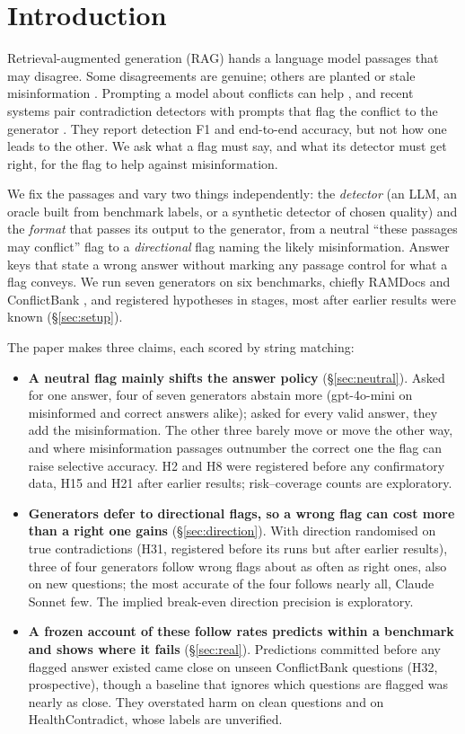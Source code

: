 \section{Introduction}

Retrieval-augmented generation (RAG) \citep{lewis2020rag} hands a language model passages that may disagree. Some
disagreements are genuine; others are planted or stale misinformation \citep{zou2025poisonedrag,wang2025madam}.
Prompting a model about conflicts can help \citep{cattan2025conflicts}, and recent systems pair contradiction
detectors with prompts that flag the conflict to the generator \citep{wang2026conflictrag}. They report detection F1
and end-to-end accuracy, but not how one leads to the other. We ask what a flag must say, and what its detector must
get right, for the flag to help against misinformation.

We fix the passages and vary two things independently: the \emph{detector} (an LLM, an oracle built from benchmark
labels, or a synthetic detector of chosen quality) and the \emph{format} that passes its output to the
generator, from a neutral ``these passages may conflict'' flag to a \emph{directional} flag naming the likely
misinformation. Answer keys that state a wrong answer without marking any passage control for what a flag conveys.
We run seven generators on six benchmarks, chiefly RAMDocs \citep{wang2025madam} and ConflictBank
\citep{su2024conflictbank}, and registered hypotheses in stages, most after earlier results were known
(\S\ref{sec:setup}).

The paper makes three claims, each scored by string matching:
\begin{itemize}[leftmargin=*,itemsep=1pt,topsep=2pt]
\item \textbf{A neutral flag mainly shifts the answer policy} (\S\ref{sec:neutral}). Asked for one answer, four
of seven generators abstain more (gpt-4o-mini on misinformed and correct answers alike); asked for every valid
answer, they add the misinformation. The other three barely move or move the other way, and where misinformation
passages outnumber the correct one the flag can raise selective accuracy. H2 and H8 were registered before any
confirmatory data, H15 and H21 after earlier results; risk--coverage counts are exploratory.
\item \textbf{Generators defer to directional flags, so a wrong flag can cost more than a right one gains}
(\S\ref{sec:direction}). With direction randomised on true contradictions (H31, registered before its runs but
after earlier results), three of four generators follow wrong flags about as often as right ones, also on new
questions; the most accurate of the four follows nearly all, Claude Sonnet few. The implied break-even direction
precision is exploratory.
\item \textbf{A frozen account of these follow rates predicts within a benchmark and shows where it fails}
(\S\ref{sec:real}). Predictions committed before any flagged answer existed came close on unseen ConflictBank
questions (H32, prospective), though a baseline that ignores which questions are flagged was nearly as close. They
overstated harm on clean questions and on HealthContradict, whose labels are unverified.
\end{itemize}

